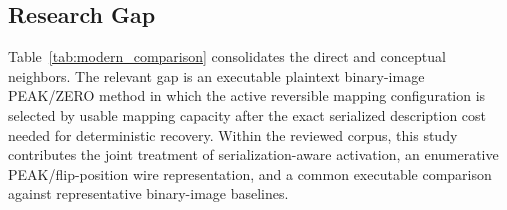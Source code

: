 \documentclass[a4paper,fleqn]{cas-dc}
\newcommand{\RevisionAddBegin}{\begingroup}
\newcommand{\RevisionAddEnd}{\endgroup}
\newcommand{\RevisionAddBegin}{\begingroup\color{revisionblue}}
\newcommand{\RevisionAddEnd}{\endgroup}
\begin{document}
\RevisionAddBegin
\subsection{Research Gap}
\RevisionAddEnd

\RevisionAddBegin
Table~\ref{tab:modern_comparison} consolidates the direct and conceptual
neighbors. The relevant gap is an executable plaintext binary-image PEAK/ZERO
method in which the active reversible mapping configuration is selected by
usable mapping capacity after the exact serialized description cost needed for
deterministic recovery. Within the reviewed corpus, this study contributes the
joint treatment of serialization-aware activation, an enumerative
PEAK/flip-position wire representation, and a common executable comparison
against representative binary-image baselines.
\RevisionAddEnd
\end{document}

